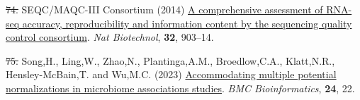 \documentclass[
]{article}
\newlength{\cslhangindent}
\newenvironment{CSLReferences}[2] %
 {\begin{list}{}{%
  \setlength{\itemindent}{0pt}
  \setlength{\leftmargin}{0pt}
  \setlength{\parsep}{0pt}
  \ifodd #1
   \setlength{\leftmargin}{\cslhangindent}
   \setlength{\itemindent}{-1\cslhangindent}
  \fi
  \setlength{\itemsep}{#2\baselineskip}}}
 {\end{list}}
\providecommand{\DIFadd}[1]{{\protect\color{blue}\uwave{#1}}} %
\providecommand{\DIFdel}[1]{{\protect\color{red}\sout{#1}}}                      %
\providecommand{\DIFaddbegin}{} %
\providecommand{\DIFaddend}{} %
\providecommand{\DIFdelbegin}{} %
\providecommand{\DIFdelend}{} %
\newcommand{\DIFscaledelfig}{0.5}
\newlength{\DIFdelgraphicswidth} %
\newlength{\DIFdelgraphicsheight} %
\newcommand{\DIFaddincludegraphics}[2][]{{\color{blue}\fbox{\DIFOincludegraphics[#1]{#2}}}} %
\newcommand{\DIFdelincludegraphics}[2][]{%
\sbox{\DIFdelgraphicsbox}{\DIFOincludegraphics[#1]{#2}}%
\settoboxwidth{\DIFdelgraphicswidth}{\DIFdelgraphicsbox} %
\settoboxtotalheight{\DIFdelgraphicsheight}{\DIFdelgraphicsbox} %
\scalebox{\DIFscaledelfig}{%
\parbox[b]{\DIFdelgraphicswidth}{\usebox{\DIFdelgraphicsbox}\\[-\baselineskip] \rule{\DIFdelgraphicswidth}{0em}}\llap{\resizebox{\DIFdelgraphicswidth}{\DIFdelgraphicsheight}{%
\setlength{\unitlength}{\DIFdelgraphicswidth}%
\begin{picture}(1,1)%
\thicklines\linethickness{2pt} %
{\color[rgb]{1,0,0}\put(0,0){\framebox(1,1){}}}%
{\color[rgb]{1,0,0}\put(0,0){\line( 1,1){1}}}%
{\color[rgb]{1,0,0}\put(0,1){\line(1,-1){1}}}%
\end{picture}%
}\hspace*{3pt}}} %
} %
\DeclareRobustCommand{\DIFaddbegin}{\DIFOaddbegin \let\includegraphics\DIFaddincludegraphics} %
\DeclareRobustCommand{\DIFaddend}{\DIFOaddend \let\includegraphics\DIFOincludegraphics} %
\DeclareRobustCommand{\DIFdelbegin}{\DIFOdelbegin \let\includegraphics\DIFdelincludegraphics} %
\DeclareRobustCommand{\DIFdelend}{\DIFOaddend \let\includegraphics\DIFOincludegraphics} %
\begin{document}
\begin{CSLReferences}{1}{1}
\DIFdelbegin \DIFdel{74. }\DIFdelend \DIFaddbegin \DIFadd{62. }\DIFaddend SEQC/MAQC-III Consortium (2014)
\href{https://doi.org/10.1038/nbt.2957}{A comprehensive assessment of
RNA-seq accuracy, reproducibility and information content by the
sequencing quality control consortium}. \emph{Nat Biotechnol},
\textbf{32}, 903--14.

\DIFdelbegin \DIFdel{75. }\DIFdelend \DIFaddbegin \DIFadd{63. }\DIFaddend Song,H., Ling,W., Zhao,N., Plantinga,A.M., Broedlow,C.A.,
Klatt,N.R., Hensley-McBain,T. and Wu,M.C. (2023)
\href{https://doi.org/10.1186/s12859-023-05147-w}{Accommodating multiple
potential normalizations in microbiome associations studies}. \emph{BMC
Bioinformatics}, \textbf{24}, 22.

\end{CSLReferences}
\end{document}
